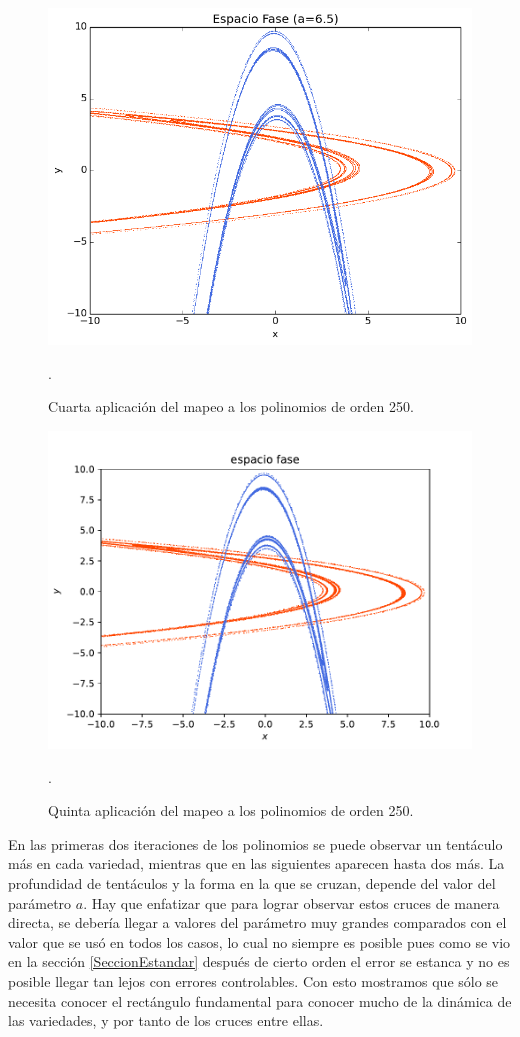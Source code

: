 \begin{figure}[H]
\centering
\includegraphics[scale=0.5]{rectangulo4A}
\caption{Cuarta aplicación del mapeo a los polinomios de orden 250.}.
\label{Rectangulo4}
\end{figure}

\begin{figure}[H]
\centering
\includegraphics[scale=0.5]{rectangulo5}
\caption{Quinta aplicación del mapeo a los polinomios de orden 250.}.
\label{Rectangulo5}
\end{figure}

En las primeras dos iteraciones de los polinomios se puede observar un tentáculo más en cada variedad, mientras que en las siguientes aparecen hasta dos más. La profundidad de tentáculos y la forma en la que se cruzan, depende del valor del parámetro $a$. Hay que enfatizar que para lograr observar estos cruces de manera directa, se debería llegar a valores del parámetro muy grandes comparados con el valor que se usó en todos los casos, lo cual no siempre es posible pues como se vio en la sección \ref{SeccionEstandar} después de cierto orden el error se estanca y no es posible llegar tan lejos con errores controlables. Con esto mostramos que sólo se necesita conocer el rectángulo fundamental para conocer mucho de la dinámica de las variedades, y por tanto de los cruces entre ellas. 


